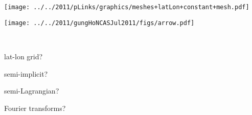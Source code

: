 \begin{slide}

\vspace{1cm}

\begin{minipage}{0.6\linewidth}
\texttt{[image: ../../2011/pLinks/graphics/meshes+latLon+constant+mesh.pdf]}

\vspace{-0.55\linewidth} \hspace{2.1in}
\texttt{[image: ../../2011/gungHoNCASJul2011/figs/arrow.pdf]}

\vspace{0.5\linewidth}\ \\
\end{minipage}
\hfill
\begin{minipage}{0.35\linewidth}

\begin{list0}
\item lat-lon grid?\pauseHS
\item semi-implicit?\pauseHS
\item semi-Lagrangian?\pauseHS
\item Fourier transforms?
\end{list0}

\end{minipage}

\end{slide}

